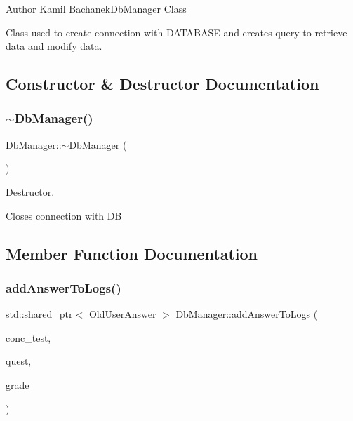 \begin{DoxyAuthor}{Author}
Kamil Bachanek\+Db\+Manager Class
\end{DoxyAuthor}
Class used to create connection with D\+A\+T\+A\+B\+A\+SE and creates query to retrieve data and modify data. 

\subsection{Constructor \& Destructor Documentation}
\mbox{\label{class_db_manager_ac5cdf8e5e932d1681ab807d8f256374c}} 
\subsubsection{\texorpdfstring{$\sim$\+Db\+Manager()}{~DbManager()}}
{\footnotesize\ttfamily Db\+Manager\+::$\sim$\+Db\+Manager (\begin{DoxyParamCaption}{ }\end{DoxyParamCaption})}



Destructor. 

Closes connection with DB 

\subsection{Member Function Documentation}
\mbox{\label{class_db_manager_a055df452020e3af56d84cbec0a42baf9}} 
\subsubsection{\texorpdfstring{add\+Answer\+To\+Logs()}{addAnswerToLogs()}}
{\footnotesize\ttfamily std\+::shared\+\_\+ptr$<$ \hyperlink{class_old_user_answer}{Old\+User\+Answer} $>$ Db\+Manager\+::add\+Answer\+To\+Logs (\begin{DoxyParamCaption}\item[{std\+::shared\+\_\+ptr$<$ \hyperlink{class_concrete_test}{Concrete\+Test} $>$}]{conc\+\_\+test,  }\item[{std\+::shared\+\_\+ptr$<$ \hyperlink{class_question}{Question} $>$}]{quest,  }\item[{unsigned short}]{grade }\end{DoxyParamCaption})}



